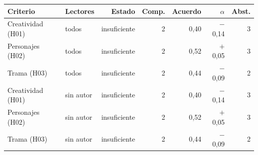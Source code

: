 \begin{tabular}{@{}llrrrrr@{}}
\toprule
Criterio & Lectores & Estado & Comp. & Acuerdo & $\alpha$ & Abst. \\
\midrule
Creatividad (H01) & todos & insuficiente & 2 & 0,40 & $-$0,14 & 3 \\
Personajes (H02) & todos & insuficiente & 2 & 0,52 & $+$0,05 & 3 \\
Trama (H03) & todos & insuficiente & 2 & 0,44 & $-$0,09 & 2 \\
Creatividad (H01) & sin autor & insuficiente & 2 & 0,40 & $-$0,14 & 3 \\
Personajes (H02) & sin autor & insuficiente & 2 & 0,52 & $+$0,05 & 3 \\
Trama (H03) & sin autor & insuficiente & 2 & 0,44 & $-$0,09 & 2 \\
\bottomrule
\end{tabular}
